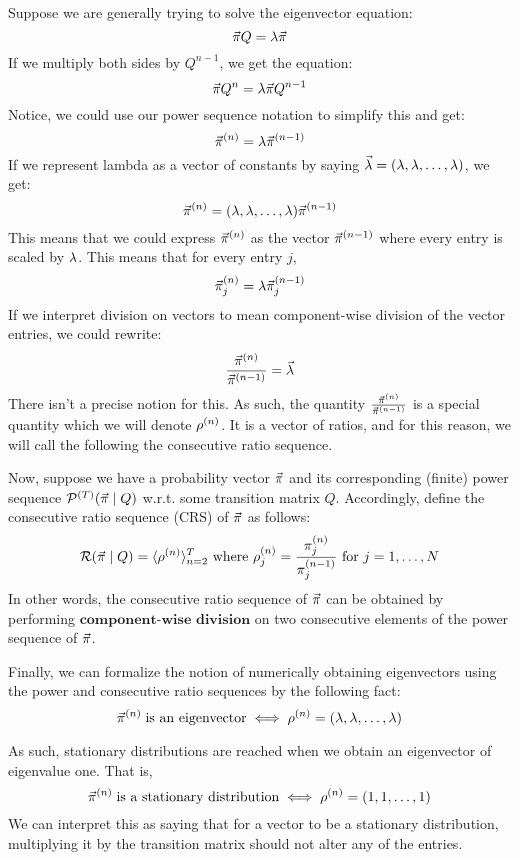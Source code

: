 
\noindent Suppose we are generally trying to solve the eigenvector equation:
$$\pivec Q = \l \pivec$$
If we multiply both sides by $Q^{n-1}$, we get the equation:
$$\pivec Q^n = \l \pivec Q^{n - 1}$$
Notice, we could use our power sequence notation to simplify this and get:
$$\pivecn{n} = \l \pivecn{n-1}$$
If we represent lambda as a vector of constants by saying $\vec{\l} = (\l, \l, \dots, \l)$, we get:
$$\pivecn{n} = \lambdasvec \pivecn{n - 1}$$
This means that we could express $\pivecn{n}$ as the vector $\pivecn{n - 1}$ where every entry is scaled by $\l$. This means that for every entry $j$,
$$\pivecn{n}_j = \lambda \pivecn{n - 1}_j$$
If we interpret division on vectors to mean component-wise division of the vector entries, we could rewrite:
$$\frac{\pivecn{n}}{\pivecn{n-1}} = \vec{\l}$$
 There isn't a precise notion for this.
As such, the quantity $\frac{\pivecn{n}}{\pivecn{n-1}}$ is a special quantity which we will denote $\rvecn{n}$.
It is a vector of ratios, and for this reason, we will call the following the consecutive ratio sequence.

\begin{definition}
Now, suppose we have a probability vector $\pivec$ and its corresponding (finite) power sequence $\Seq^{(\maxtime)}(\pivec \mid Q)$ w.r.t. some transition matrix $Q$.
Accordingly, define the consecutive ratio sequence (CRS) of $\pivec$ as follows:
$$\Rseq(\pivec \mid Q) = \langle \rvecn{n} \rangle_{n=2}^\maxtime \text{ where } \rvecn{n}_j = \frac{\pin{n}_j}{\pin{n-1}_j} \text{ for } j = \oneto[N]$$
In other words, the consecutive ratio sequence of $\pivec$ can be obtained by performing $\textbf{component-wise division}$ on two consecutive elements of the power sequence of $\pivec$.
\end{definition}



Finally, we can formalize the notion of numerically obtaining eigenvectors using the power and consecutive ratio sequences by the following fact:
$$ \pivecn{n} \; \text{is an eigenvector} \iff \rvecn{n} = \lambdasvec$$

As such, stationary distributions are reached when we obtain an eigenvector of eigenvalue one. That is,
$$ \pivecn{n} \; \text{is a stationary distribution} \iff \rvecn{n} = (1,1,\dots,1)$$
We can interpret this as saying that for a vector to be a stationary distribution, multiplying it by the transition matrix should not alter any of the entries.


